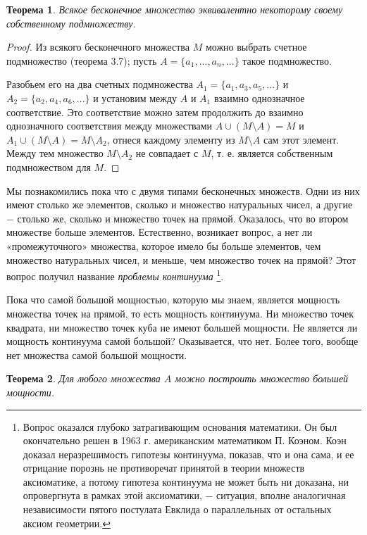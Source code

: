 \documentclass{article}
\newtheorem{theorem}{Теорема}[section]
\begin{document}
\begin{theorem}
Всякое бесконечное множество эквивалентно некоторому своему собственному подмножеству.
\end{theorem}

\begin{proof}
Из всякого бесконечного множества \(M\) можно выбрать счетное подмножество (теорема 3.7); пусть \(A = \{a_1, ..., a_n, ...\}\) такое подмножество.

Разобьем его на два счетных подмножества \(A_1 = \{a_1, a_3, a_5, ...\}\) и \(A_2 = \{a_2, a_4, a_6, ...\}\) и установим между \(A\) и \(A_1\) взаимно однозначное соответствие. Это соответствие можно затем продолжить до взаимно однозначного соответствия между множествами \(A \cup (M \setminus A) = M\) и \(A_1 \cup (M \setminus A) = M \setminus A_2\), отнеся каждому элементу из \(M \setminus A\) сам этот элемент. Между тем множество \(M \setminus A_2\) не совпадает с \(M\), т. е. является собственным подмножеством для \(M\).
\end{proof}

Мы познакомились пока что с двумя типами бесконечных множеств. Одни из них имеют столько же элементов, сколько и множество натуральных чисел, а другие \(-\) столько же, сколько и множество точек на прямой. Оказалось, что во втором множестве больше элементов. Естественно, возникает вопрос, а нет ли «промежуточного» множества, которое имело бы больше элементов, чем множество натуральных чисел, и меньше, чем множество точек на прямой? Этот вопрос получил название \textit{проблемы континуума}
\footnote[1]
{
Вопрос оказался глубоко затрагивающим основания математики. Он был окончательно решен в 1963 г. американским математиком П. Коэном. Коэн доказал неразрешимость гипотезы континуума, показав, что и она сама, и ее отрицание порознь не противоречат принятой в теории множеств аксиоматике, а потому гипотеза континуума не может быть ни доказана, ни опровергнута в рамках этой аксиоматики, \(-\) ситуация, вполне аналогичная независимости пятого постулата Евклида о параллельных от остальных аксиом геометрии.
}. \newline

Пока что самой большой мощностью, которую мы знаем, является мощность множества точек на прямой, то есть мощность континуума. Ни множество точек квадрата, ни множество точек куба не имеют большей мощности. Не является ли мощность континуума самой большой? Оказывается, что нет. Более того, вообще нет множества самой большой мощности.

\begin{theorem}
Для любого множества \(A\) можно построить множество большей мощности.
\end{theorem}
\end{document}
